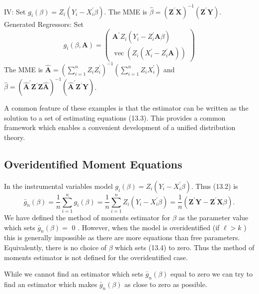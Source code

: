 \documentclass[10pt]{article}
\begin{document}
IV: Set $g_{i}(\beta)=Z_{i}\left(Y_{i}-X_{i}^{\prime} \beta\right)$. The MME is $\widehat{\beta}=\left(\boldsymbol{Z}^{\prime} \boldsymbol{X}\right)^{-1}\left(\boldsymbol{Z}^{\prime} \boldsymbol{Y}\right)$. Generated Regressors: Set
$$
g_{i}(\beta, \boldsymbol{A})=\left(\begin{array}{c}
\boldsymbol{A}^{\prime} Z_{i}\left(Y_{i}-Z_{i}^{\prime} \boldsymbol{A} \beta\right) \\
\operatorname{vec}\left(Z_{i}\left(X_{i}^{\prime}-Z_{i}^{\prime} \boldsymbol{A}\right)\right)
\end{array}\right)
$$
The MME is $\widehat{\boldsymbol{A}}=\left(\sum_{i=1}^{n} Z_{i} Z_{i}^{\prime}\right)^{-1}\left(\sum_{i=1}^{n} Z_{i} X_{i}^{\prime}\right)$ and $\widehat{\beta}=\left(\widehat{\boldsymbol{A}}^{\prime} \boldsymbol{Z}^{\prime} \boldsymbol{Z} \widehat{\boldsymbol{A}}\right)^{-1}\left(\widehat{\boldsymbol{A}}^{\prime} \boldsymbol{Z}^{\prime} \boldsymbol{Y}\right)$.

A common feature of these examples is that the estimator can be written as the solution to a set of estimating equations (13.3). This provides a common framework which enables a convenient development of a unified distribution theory.

\subsection{Overidentified Moment Equations}
In the instrumental variables model $g_{i}(\beta)=Z_{i}\left(Y_{i}-X_{i}^{\prime} \beta\right)$. Thus (13.2) is
$$
\bar{g}_{n}(\beta)=\frac{1}{n} \sum_{i=1}^{n} g_{i}(\beta)=\frac{1}{n} \sum_{i=1}^{n} Z_{i}\left(Y_{i}-X_{i}^{\prime} \beta\right)=\frac{1}{n}\left(\boldsymbol{Z}^{\prime} \boldsymbol{Y}-\boldsymbol{Z}^{\prime} \boldsymbol{X} \beta\right) .
$$
We have defined the method of moments estimator for $\beta$ as the parameter value which sets $\bar{g}_{n}(\beta)=$ 0 . However, when the model is overidentified (if $\ell>k$ ) this is generally impossible as there are more equations than free parameters. Equivalently, there is no choice of $\beta$ which sets (13.4) to zero. Thus the method of moments estimator is not defined for the overidentified case.

While we cannot find an estimator which sets $\bar{g}_{n}(\beta)$ equal to zero we can try to find an estimator which makes $\bar{g}_{n}(\beta)$ as close to zero as possible.
\end{document}
